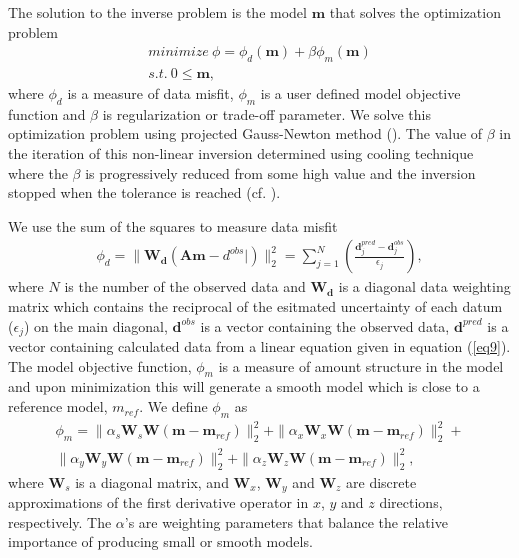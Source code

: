 \documentclass[a4paper, 11pt]{article}
\begin{document}
The solution to the inverse problem is the model $\mathbf{m}$ that solves the optimization problem
\begin{eqnarray}
  minimize \ \phi =  \phi_d(\mathbf{m}) + \beta\phi_m(\mathbf{m})\nonumber \\
  s.t. \ 0 \le \mathbf{m},
  \label{eq10}
\end{eqnarray}
where $\phi_d$ is a measure of data misfit, $\phi_m$ is a user defined model objective function and $\beta$ is regularization or trade-off parameter. We solve this optimization problem using projected Gauss-Newton method (\cite{Kelley}). 
The value of $\beta$ in the iteration of this non-linear inversion determined using cooling technique where the $\beta$ is progressively reduced from some high value and the inversion stopped when the tolerance is reached (cf. \cite{Kang2014}). 

We use the sum of the squares to measure data misfit
\begin{eqnarray}
  \phi_d = \| \mathbf{W_d}(\mathbf{A}\mathbf{m}-d^{obs}|)\|^2_2 =
  \sum^N_{j=1}(\frac{\mathbf{d}^{pred}_j-\mathbf{d}^{obs}_j}{\epsilon_j}),
  \label{eq11}
\end{eqnarray}
where $N$ is the number of the observed data and $\mathbf{W_d}$ is a diagonal data weighting matrix which contains the reciprocal of the esitmated uncertainty of each datum ($\epsilon_j$) on the main diagonal,  $\mathbf{d}^{obs}$ is a vector containing the observed data, $\mathbf{d}^{pred}$ is a vector containing calculated data from a linear equation given in equation (\ref{eq9}).
The model objective function, $\phi_m$ is a measure of amount structure in the model and upon minimization this will generate a smooth model which is close to a reference model, $m_{ref}$. 
We define $\phi_m$ as
\begin{eqnarray}
  \phi_m = \| \alpha_s\mathbf{W}_s\mathbf{W}(\mathbf{m}-\mathbf{m}_{ref})\|^2_2+
       \| \alpha_x\mathbf{W}_x\mathbf{W}(\mathbf{m}-\mathbf{m}_{ref})\|^2_2+ \nonumber \\
       \| \alpha_y\mathbf{W}_y\mathbf{W}(\mathbf{m}-\mathbf{m}_{ref})\|^2_2+
       \| \alpha_z\mathbf{W}_z\mathbf{W}(\mathbf{m}-\mathbf{m}_{ref})\|^2_2,
  \label{eq12}
\end{eqnarray}
where $\mathbf{W}_s$ is a diagonal matrix, and $\mathbf{W}_x$, $\mathbf{W}_y$ and $\mathbf{W}_z$ are discrete approximations of the first derivative operator in $x$, $y$ and $z$ directions, respectively.  
The $\alpha$'s are weighting parameters that balance the relative importance of producing small or smooth models.
\end{document}
